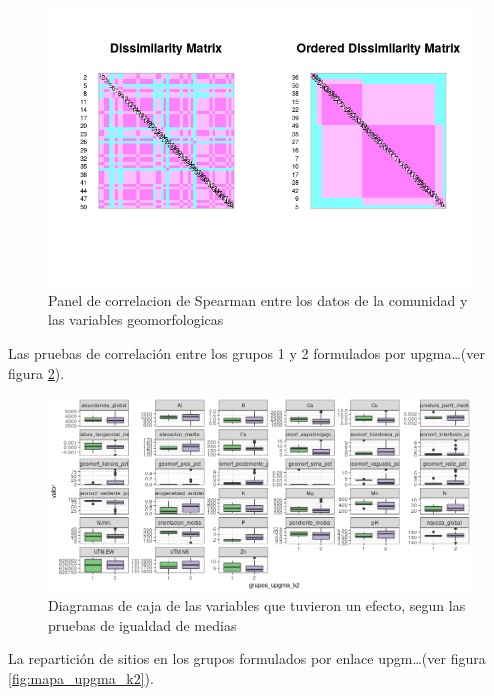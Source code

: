 \documentclass[11pt,]{article}
\begin{document}
\begin{figure}
\centering
\includegraphics{medicion_asociacion_jaccard.png}
\caption{Panel de correlacion de Spearman entre los datos de la
comunidad y las variables
geomorfologicas\label{fig:matriz_correlacion_geomorf_abun_riq_spearman}}
\end{figure}

Las pruebas de correlación entre los grupos 1 y 2 formulados por
upgma\ldots{}(ver figura \ref{fig:grupos_upgma}).

\begin{figure}
\centering
\includegraphics[width=1.00000\textwidth]{actualizacion2_grupos_upgma.png}
\caption{Diagramas de caja de las variables que tuvieron un efecto,
segun las pruebas de igualdad de medias\label{fig:grupos_upgma}}
\end{figure}

La repartición de sitios en los grupos formulados por enlace
upgm\ldots{}(ver figura \ref{fig:mapa_upgma_k2}).
\end{document}
